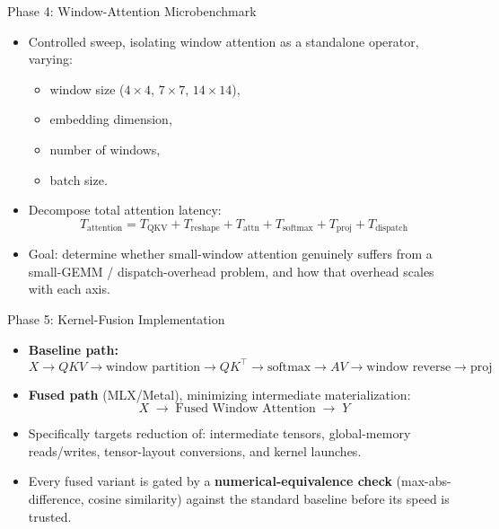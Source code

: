 \documentclass[aspectratio=169]{beamer}
\begin{document}
\begin{frame}{Phase 4: Window-Attention Microbenchmark}
  \begin{itemize}
    \item Controlled sweep, isolating window attention as a standalone operator, varying:
    \begin{itemize}
      \item window size ($4\times4$, $7\times7$, $14\times14$),
      \item embedding dimension,
      \item number of windows,
      \item batch size.
    \end{itemize}
    \item Decompose total attention latency:
    \[
      T_{\text{attention}} = T_{\text{QKV}} + T_{\text{reshape}} + T_{\text{attn}} +
        T_{\text{softmax}} + T_{\text{proj}} + T_{\text{dispatch}}
    \]
    \item Goal: determine whether small-window attention genuinely suffers from a
      small-GEMM / dispatch-overhead problem, and how that overhead scales with each axis.
  \end{itemize}
\end{frame}

\begin{frame}{Phase 5: Kernel-Fusion Implementation}
  \begin{itemize}
    \item \textbf{Baseline path:}
    \[
      X \rightarrow QKV \rightarrow \text{window partition} \rightarrow QK^\top \rightarrow
      \text{softmax} \rightarrow AV \rightarrow \text{window reverse} \rightarrow \text{proj}
    \]
    \item \textbf{Fused path} (MLX/Metal), minimizing intermediate materialization:
    \[
      X \;\longrightarrow\; \boxed{\text{Fused Window Attention}} \;\longrightarrow\; Y
    \]
    \item Specifically targets reduction of: intermediate tensors, global-memory
      reads/writes, tensor-layout conversions, and kernel launches.
    \item Every fused variant is gated by a \textbf{numerical-equivalence check}
      (max-abs-difference, cosine similarity) against the standard baseline before its speed is
      trusted.
  \end{itemize}
\end{frame}
\end{document}
